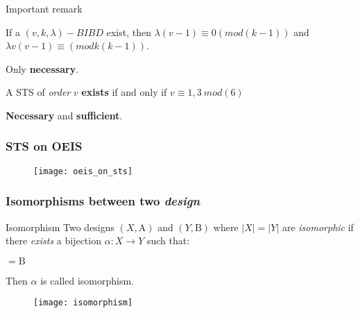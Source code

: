 \begin{frame}[plain,c]
\begin{center}
	\huge Important remark
\end{center}
\end{frame}

\begin{frame}
	\pause[1]
	\begin{theorem}
		If a $(v,k,\lambda)-BIBD$ exist, then $\lambda(v-1) \equiv 0 (mod(k-1))$ and $\lambda v(v-1) \equiv (mod k(k-1))$.
	\end{theorem}
	
	\pause[2]
	Only \textbf{necessary}.
	
	\pause[1]
	\begin{theorem}
		A STS of \textit{order} $v$ \textbf{exists} if and only if $v\equiv 1,3\ mod(6)$  
	\end{theorem}
	
	\pause[2]
	\textbf{Necessary} and \textbf{sufficient}.
\end{frame}
\begin{frame}
\frametitle{STS on OEIS}
\begin{figure}
	\texttt{[image: oeis\_on\_sts]}
\end{figure}
\end{frame}

\begin{frame}
\frametitle{Isomorphisms between two \textit{design}}
\begin{block}{Isomorphism}
Two designs $(X,\mathrm{A})$ and $(Y,\mathrm{B})$ where $|X|=|Y|$ are \textit{isomorphic} if there \textit{exists} a bijection $\alpha : X \rightarrow Y$ such that:
\begin{center}
	\begin{math}
	[ \{ \alpha(x) : x \in A \}: A \mathrm{A} ] = \mathrm{B}
	\end{math}%

\end{center}
Then $\alpha$ is called isomorphism.
\end{block}
\begin{figure}
	\texttt{[image: isomorphism]}
\end{figure}
\end{frame}

